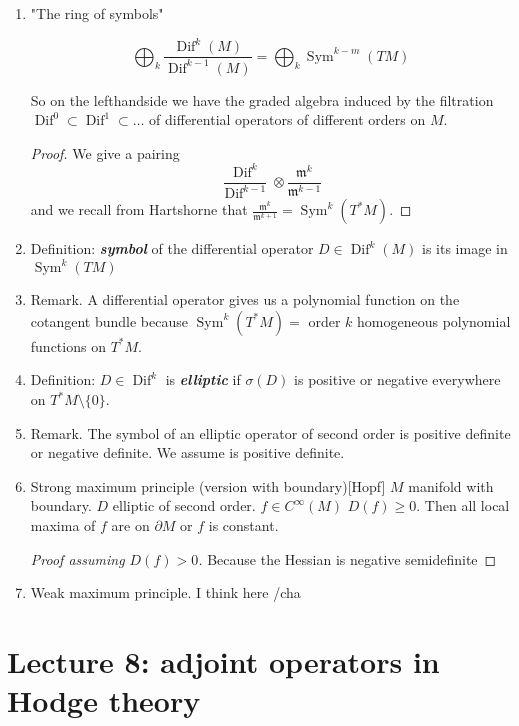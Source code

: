 \begin{enumerate}
\item "The ring of symbols"
	\begin{thm}\leavevmode
		\[\bigoplus_{k}\frac{\operatorname{Dif}^k(M)}{\operatorname{Dif}^{k-1}(M)}=\bigoplus_{k}\operatorname{Sym}^{k-m}(TM)\]
	\end{thm}
	So on the lefthandside we have the graded algebra induced by the filtration \(\operatorname{Dif}^0 \subset \operatorname{Dif}^1 \subset \ldots\) of differential operators of different orders on \(M\).

	\begin{proof}\leavevmode
	We give a pairing
	\[\frac{\operatorname{Dif}^k}{\operatorname{Dif}^{k-1}}\otimes \frac{\mathfrak{m}^k}{\mathfrak{m}^{k-1}}\]
and we recall from Hartshorne that \(\frac{\mathfrak{m}^k}{\mathfrak{m}^{k+1}}=\operatorname{Sym}^k(T^*M)\).
	\end{proof}

	\item Definition: \textit{\textbf{symbol}} of the differential operator \(D \in \operatorname{Dif}^k(M)\) is its image in \(\operatorname{Sym}^k(TM)\)
	\item Remark. A differential operator gives us a polynomial function on the cotangent bundle because \(\operatorname{Sym}^k(T^*M)=\) order \(k\) homogeneous polynomial functions on \(T ^* M\).
	\item Definition: \(D \in \operatorname{Dif}^k\) is \textit{\textbf{elliptic}} if \(\sigma(D)\) is positive or negative everywhere on \(T^* M\setminus\{0\}\).
	\item Remark. The symbol of an elliptic operator of second order is positive definite or negative definite. We assume is positive definite. 
	\item 
		\begin{thing6}{Strong maximum principle (version with boundary)}[Hopf]\leavevmode
		\(M\) manifold with boundary. \(D\) elliptic of second order. $f \in C^\infty(M)$  \(D(f) \geq  0\). Then all local maxima of $f$ are on \(\partial M\) or $f$ is constant.
		\end{thing6}
		\begin{proof}[Proof assuming \(D(f)>0\)]\leavevmode
		Because the Hessian is negative semidefinite
		\end{proof}
	\item Weak maximum principle. I think here /cha
		\end{enumerate}

\section{Lecture 8: adjoint operators in Hodge theory}

